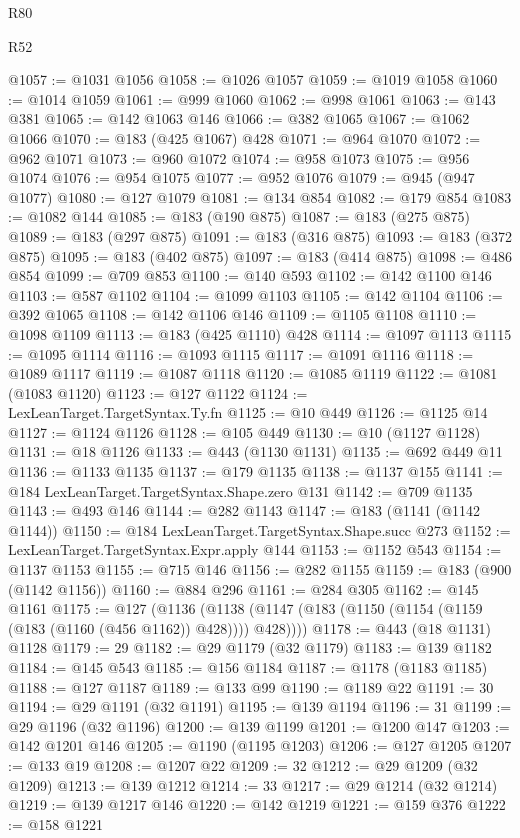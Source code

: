 \begin{lexlean}{R80}
\begin{lexlean}{R52}
\begin{coremodule}
{{{{{{{{{{{{{{{{{{{{{{{{{{{{{{{{{{{{{{{{{{{{{{{{{{{{{{{{{{{{{{{{{{{{{{{{{{{{{{{{{{{{{{{{{{{{{{{{{{{{{{{{{{{{{{{{{{{{{{{{{{{{{{{{{{{{{{{{{{{{{{{{{{{{{{{{{{{{{{{{{{{{{{{{{{{{{{{{{{{{{{{{{{{{{{{{{{{{{{@1057 := @1031 @1056
@1058 := @1026 @1057
@1059 := @1019 @1058
@1060 := @1014 @1059
@1061 := @999 @1060
@1062 := @998 @1061
@1063 := @143 @381
@1065 := @142 @1063 @146
@1066 := @382 @1065
@1067 := @1062 @1066
@1070 := @183 (@425 @1067) @428
@1071 := @964 @1070
@1072 := @962 @1071
@1073 := @960 @1072
@1074 := @958 @1073
@1075 := @956 @1074
@1076 := @954 @1075
@1077 := @952 @1076
@1079 := @945 (@947 @1077)
@1080 := @127 @1079
@1081 := @134 @854
@1082 := @179 @854
@1083 := @1082 @144
@1085 := @183 (@190 @875)
@1087 := @183 (@275 @875)
@1089 := @183 (@297 @875)
@1091 := @183 (@316 @875)
@1093 := @183 (@372 @875)
@1095 := @183 (@402 @875)
@1097 := @183 (@414 @875)
@1098 := @486 @854
@1099 := @709 @853
@1100 := @140 @593
@1102 := @142 @1100 @146
@1103 := @587 @1102
@1104 := @1099 @1103
@1105 := @142 @1104
@1106 := @392 @1065
@1108 := @142 @1106 @146
@1109 := @1105 @1108
@1110 := @1098 @1109
@1113 := @183 (@425 @1110) @428
@1114 := @1097 @1113
@1115 := @1095 @1114
@1116 := @1093 @1115
@1117 := @1091 @1116
@1118 := @1089 @1117
@1119 := @1087 @1118
@1120 := @1085 @1119
@1122 := @1081 (@1083 @1120)
@1123 := @127 @1122
@1124 := LexLeanTarget.TargetSyntax.Ty.fn
@1125 := @10 @449
@1126 := @1125 @14
@1127 := @1124 @1126
@1128 := @105 @449
@1130 := @10 (@1127 @1128)
@1131 := @18 @1126
@1133 := @443 (@1130 @1131)
@1135 := @692 @449 @11
@1136 := @1133 @1135
@1137 := @179 @1135
@1138 := @1137 @155
@1141 := @184 LexLeanTarget.TargetSyntax.Shape.zero @131
@1142 := @709 @1135
@1143 := @493 @146
@1144 := @282 @1143
@1147 := @183 (@1141 (@1142 @1144))
@1150 := @184 LexLeanTarget.TargetSyntax.Shape.succ @273
@1152 := LexLeanTarget.TargetSyntax.Expr.apply @144
@1153 := @1152 @543
@1154 := @1137 @1153
@1155 := @715 @146
@1156 := @282 @1155
@1159 := @183 (@900 (@1142 @1156))
@1160 := @884 @296
@1161 := @284 @305
@1162 := @145 @1161
@1175 := @127
    (@1136 (@1138 (@1147 (@183 (@1150 (@1154 (@1159 (@183 (@1160 (@456 @1162)) @428)))) @428))))
@1178 := @443 (@18 @1131) @1128
@1179 := 29
@1182 := @29 @1179 (@32 @1179)
@1183 := @139 @1182
@1184 := @145 @543
@1185 := @156 @1184
@1187 := @1178 (@1183 @1185)
@1188 := @127 @1187
@1189 := @133 @99
@1190 := @1189 @22
@1191 := 30
@1194 := @29 @1191 (@32 @1191)
@1195 := @139 @1194
@1196 := 31
@1199 := @29 @1196 (@32 @1196)
@1200 := @139 @1199
@1201 := @1200 @147
@1203 := @142 @1201 @146
@1205 := @1190 (@1195 @1203)
@1206 := @127 @1205
@1207 := @133 @19
@1208 := @1207 @22
@1209 := 32
@1212 := @29 @1209 (@32 @1209)
@1213 := @139 @1212
@1214 := 33
@1217 := @29 @1214 (@32 @1214)
@1219 := @139 @1217 @146
@1220 := @142 @1219
@1221 := @159 @376
@1222 := @158 @1221
}}}}}}}}}}}}}}}}}}}}}}}}}}}}}}}}}}}}}}}}}}}}}}}}}}}}}}}}}}}}}}}}}}}}}}}}}}}}}}}}}}}}}}}}}}}}}}}}}}}}}}}}}}}}}}}}}}}}}}}}}}}}}}}}}}}}}}}}}}}}}}}}}}}}}}}}}}}}}}}}}}}}}}}}}}}}}}}}}}}}}}}}}}}}}}}}}}}}}}
\end{coremodule}
\end{lexlean}
\end{lexlean}
